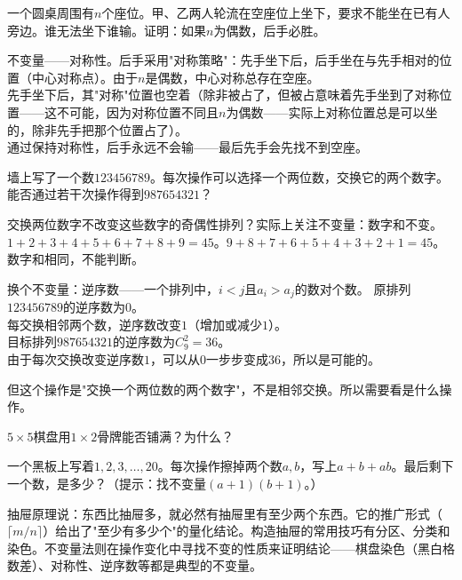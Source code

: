 \begin{example}
一个圆桌周围有$n$个座位。甲、乙两人轮流在空座位上坐下，要求不能坐在已有人旁边。谁无法坐下谁输。证明：如果$n$为偶数，后手必胜。
\end{example}
\begin{solution}
不变量——对称性。后手采用"对称策略"：先手坐下后，后手坐在与先手相对的位置（中心对称点）。由于$n$是偶数，中心对称总存在空座。\\
先手坐下后，其"对称"位置也空着（除非被占了，但被占意味着先手坐到了对称位置——这不可能，因为对称位置不同且$n$为偶数——实际上对称位置总是可以坐的，除非先手把那个位置占了）。\\
通过保持对称性，后手永远不会输——最后先手会先找不到空座。
\end{solution}

\begin{example}
墙上写了一个数$123456789$。每次操作可以选择一个两位数，交换它的两个数字。能否通过若干次操作得到$987654321$？
\end{example}
\begin{solution}
交换两位数字不改变这些数字的奇偶性排列？实际上关注不变量：数字和不变。\\
$1+2+3+4+5+6+7+8+9 = 45$。$9+8+7+6+5+4+3+2+1 = 45$。数字和相同，不能判断。

换个不变量：逆序数——一个排列中，$i<j$且$a_i>a_j$的数对个数。
原排列$123456789$的逆序数为$0$。\\
每交换相邻两个数，逆序数改变$1$（增加或减少$1$）。\\
目标排列$987654321$的逆序数为$C_9^2=36$。\\
由于每次交换改变逆序数$1$，可以从$0$一步步变成$36$，所以是可能的。

但这个操作是"交换一个两位数的两个数字"，不是相邻交换。所以需要看是什么操作。
\end{solution}

\begin{exercise}
\item $5\times5$棋盘用$1\times2$骨牌能否铺满？为什么？
\item 一个黑板上写着$1,2,3,\dots,20$。每次操作擦掉两个数$a,b$，写上$a+b+ab$。最后剩下一个数，是多少？（提示：找不变量$(a+1)(b+1)$。）
\end{exercise}


抽屉原理说：东西比抽屉多，就必然有抽屉里有至少两个东西。它的推广形式（$\lceil m/n\rceil$）给出了"至少有多少个"的量化结论。构造抽屉的常用技巧有分区、分类和染色。不变量法则在操作变化中寻找不变的性质来证明结论——棋盘染色（黑白格数差）、对称性、逆序数等都是典型的不变量。

